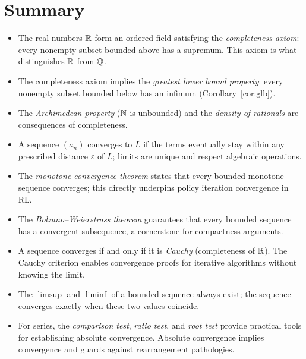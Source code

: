 \documentclass[11pt,a4paper]{article}
\begin{document}
\section{Summary}
\label{sec:summary}

\begin{itemize}
  \item The real numbers $\mathbb{R}$ form an ordered field satisfying the
    \emph{completeness axiom}: every nonempty subset bounded above has a
    supremum. This axiom is what distinguishes $\mathbb{R}$ from $\mathbb{Q}$.

  \item The completeness axiom implies the \emph{greatest lower bound
    property}: every nonempty subset bounded below has an infimum
    (Corollary~\ref{cor:glb}).

  \item The \emph{Archimedean property} ($\mathbb{N}$ is unbounded) and the
    \emph{density of rationals} are consequences of completeness.

  \item A sequence $(a_n)$ converges to $L$ if the terms eventually stay
    within any prescribed distance $\varepsilon$ of $L$; limits are
    unique and respect algebraic operations.

  \item The \emph{monotone convergence theorem} states that every bounded
    monotone sequence converges; this directly underpins policy iteration
    convergence in RL.

  \item The \emph{Bolzano--Weierstrass theorem} guarantees that every
    bounded sequence has a convergent subsequence, a cornerstone for
    compactness arguments.

  \item A sequence converges if and only if it is \emph{Cauchy}
    (completeness of $\mathbb{R}$). The Cauchy criterion enables convergence
    proofs for iterative algorithms without knowing the limit.

  \item The $\limsup$ and $\liminf$ of a bounded sequence always exist;
    the sequence converges exactly when these two values coincide.

  \item For series, the \emph{comparison test}, \emph{ratio test}, and
    \emph{root test} provide practical tools for establishing absolute
    convergence. Absolute convergence implies convergence and guards
    against rearrangement pathologies.
\end{itemize}
\end{document}
